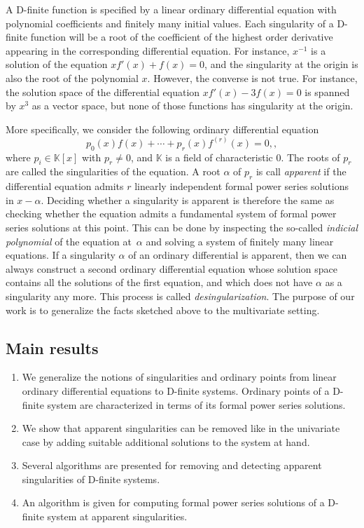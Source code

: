 \documentclass[10pt,a4paper]{article}
\newcommand{\bK}{ {\mathbb  K}}
\begin{document}
A D-finite function is specified by a linear ordinary differential equation with polynomial 
coefficients and finitely many initial values. Each singularity of a D-finite function 
will be a root of the coefficient of the highest order derivative appearing 
in the corresponding differential equation. 
For instance, $x^{-1}$ is a solution of the equation $x f'(x) + f(x) = 0$, 
and the singularity at the origin is also the root of the polynomial $x$. 
However, the converse is not true. For instance, the solution space of 
the differential equation $x f'(x) - 3 f(x) = 0$ is spanned by $x^3$ as a vector space, 
but none of those functions has singularity at the origin.

More specifically, we consider the following ordinary differential equation 
$$p_0(x)f(x) + \cdots + p_r(x)f^{(r)}(x) = 0,,$$ 
where $p_i \in \bK[x]$ with $p_r\neq0$, and $\bK$ is a field of characteristic $0$.  
The roots of $p_r$ are called the
singularities of the equation. A root $\alpha$ of $p_r$ is call \emph{apparent} if the
differential equation admits $r$ linearly independent formal power series solutions in 
$x - \alpha$. Deciding whether a singularity is apparent is therefore the same as
checking whether the equation admits a fundamental system of formal power series
solutions at this point. This can be done by inspecting the so-called
\emph{indicial polynomial} of the equation at~$\alpha$ and solving a system of finitely many linear equations. 
If a singularity $\alpha$ of an ordinary differential is apparent, then we can always 
construct a second ordinary differential equation whose solution space contains all the solutions of the
first equation, and which does not have $\alpha$ as a singularity any more. 
This process is called \emph{desingularization}. The purpose of our work is to generalize the facts sketched above to
the multivariate setting.

\subsection{Main results}

\begin{enumerate}
 \item We generalize the notions of singularities and ordinary points from linear ordinary differential equations to D-finite systems. 
 Ordinary points of a D-finite system are characterized in terms of its formal power series solutions.
 \item We show that apparent singularities can be removed like in the univariate
case by adding suitable additional solutions to the system at hand.
 \item Several algorithms are presented for removing and detecting apparent singularities of D-finite systems.
 \item An algorithm is given for computing formal power series solutions of a D-finite system
at apparent singularities.
\end{enumerate}
\end{document}
